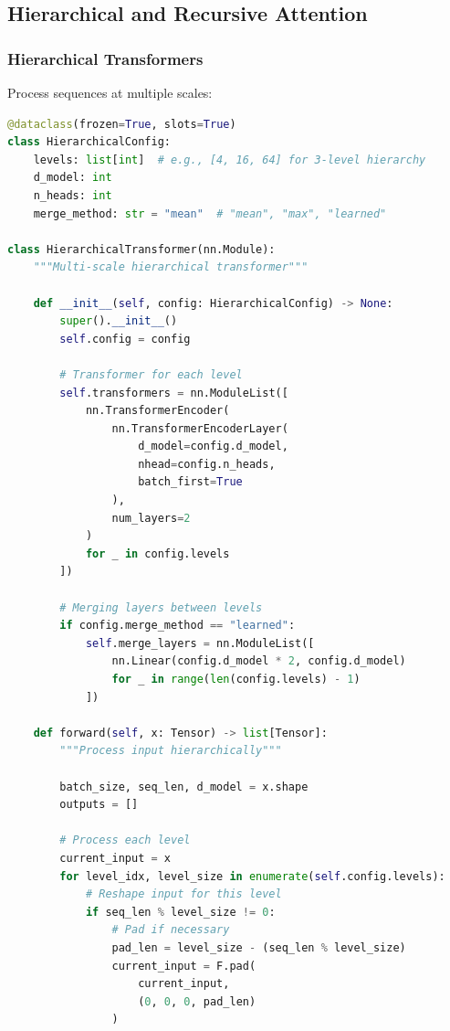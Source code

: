 \documentclass[11pt]{article}
\begin{document}
\subsection{Hierarchical and Recursive Attention}

\subsubsection{Hierarchical Transformers}

Process sequences at multiple scales:

\begin{lstlisting}[language=Python, caption=Hierarchical Transformer Architecture]
@dataclass(frozen=True, slots=True)
class HierarchicalConfig:
    levels: list[int]  # e.g., [4, 16, 64] for 3-level hierarchy
    d_model: int
    n_heads: int
    merge_method: str = "mean"  # "mean", "max", "learned"

class HierarchicalTransformer(nn.Module):
    """Multi-scale hierarchical transformer"""
    
    def __init__(self, config: HierarchicalConfig) -> None:
        super().__init__()
        self.config = config
        
        # Transformer for each level
        self.transformers = nn.ModuleList([
            nn.TransformerEncoder(
                nn.TransformerEncoderLayer(
                    d_model=config.d_model,
                    nhead=config.n_heads,
                    batch_first=True
                ),
                num_layers=2
            )
            for _ in config.levels
        ])
        
        # Merging layers between levels
        if config.merge_method == "learned":
            self.merge_layers = nn.ModuleList([
                nn.Linear(config.d_model * 2, config.d_model)
                for _ in range(len(config.levels) - 1)
            ])
    
    def forward(self, x: Tensor) -> list[Tensor]:
        """Process input hierarchically"""
        
        batch_size, seq_len, d_model = x.shape
        outputs = []
        
        # Process each level
        current_input = x
        for level_idx, level_size in enumerate(self.config.levels):
            # Reshape input for this level
            if seq_len % level_size != 0:
                # Pad if necessary
                pad_len = level_size - (seq_len % level_size)
                current_input = F.pad(
                    current_input, 
                    (0, 0, 0, pad_len)
                )
            

\end{lstlisting}
\end{document}
